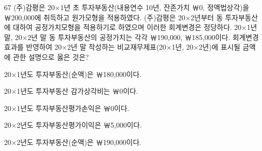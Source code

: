 \begin{question}{67}
(주)감평은 20×1년 초 투자부동산(내용연수 10년, 잔존가치 ￦0, 정액법상각)을 ￦200,000에 취득하고 원가모형을 적용하였다. (주)감평은 20×2년부터 동 투자부동산에 대하여 공정가치모형을 적용하기로 하였으며 이러한 회계변경은 정당하다. 20×1년 말, 20×2년 말 동 투자부동산의 공정가치는 각각 ￦190,000, ￦185,000이다. 회계변경효과를 반영하여 20×2년 말 작성하는 비교재무제표(20×1년, 20×2년)에 표시될 금액에 관한 설명으로 옳은 것은?
\begin{choices}
  \item 20×1년도 투자부동산(순액)은 ￦180,000이다.
  \item 20×1년도 투자부동산 감가상각비는 ￦0이다.
  \item 20×1년도 투자부동산평가손익은 ￦0이다.
  \item 20×2년도 투자부동산평가이익은 ￦5,000이다.
  \item 20×2년도 투자부동산(순액)은 ￦190,000이다.
\end{choices}
\end{question}
